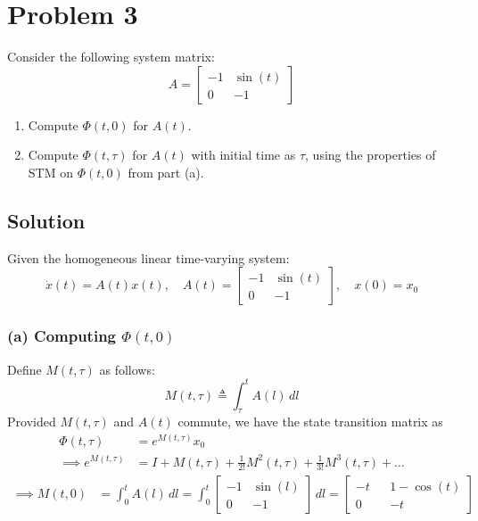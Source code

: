\section*{Problem 3}
\setcounter{section}{3}

Consider the following system matrix:
\begin{equation*}
    A
    =
    \begin{bmatrix}
        -1 & \sin(t) \\
        0  & -1
    \end{bmatrix}
\end{equation*}
\begin{enumerate}[label= (\alph*)]
    \item Compute \( \Phi(t, 0) \) for \( A(t) \).
    \item Compute \( \Phi(t, \tau) \) for \( A(t) \) with initial time as \( \tau \), using the properties of STM on \( \Phi(t, 0) \) from part (a).
\end{enumerate}

\subsection*{Solution}

Given the homogeneous linear time-varying system:
\begin{equation*}
    \dot{x}(t) = A(t) x(t),
    \quad
    A(t)
    =
    \begin{bmatrix}
        -1 & \sin(t) \\
        0  & -1
    \end{bmatrix},
    \quad
    x(0) = x_0
\end{equation*}

\subsubsection*{(a) Computing \( \Phi(t, 0) \)}

Define \( M(t, \tau) \) as follows:
\begin{equation}\label{eq:M(t, tau)}
    M(t, \tau)
    \triangleq
    \int_{\tau}^{t} A(l) \, dl
\end{equation}
Provided \( M(t, \tau) \) and \( A(t) \) commute, we have the state transition matrix as
\begin{align*}
    \Phi(t, \tau)
     & =
    e^{M(t, \tau)} x_0
    \\
    \implies
    e^{M(t, \tau)}
     & =
    I + M(t, \tau) + \frac{1}{2!} M^2(t, \tau) + \frac{1}{3!} M^3(t, \tau) + \ldots
\end{align*}
\begin{align*}
    \implies
    M(t, 0)
     & =
    \int_{0}^{t} A(l) \, dl
    =
    \int_{0}^{t}
    \begin{bmatrix}
        -1 & \sin(l) \\
        0  & -1
    \end{bmatrix}
    \, dl
    =
    \begin{bmatrix}
        -t &  & 1 - \cos(t) \\
        0  &  & -t
    \end{bmatrix}
\end{align*}

